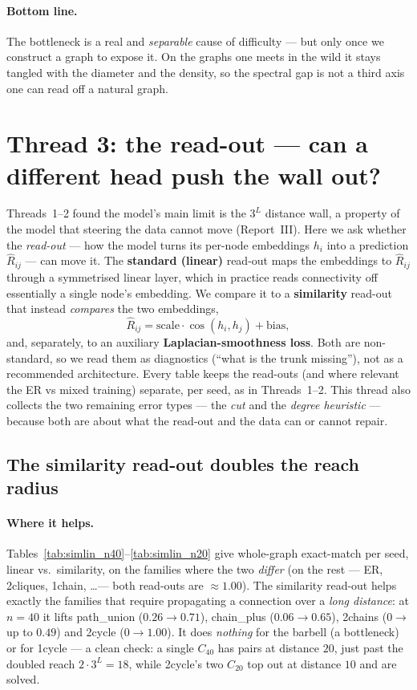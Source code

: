 \documentclass[11pt,a4paper]{article}
\begin{document}
\paragraph{Bottom line.} The bottleneck is a real and \emph{separable} cause of difficulty --- but
only once we construct a graph to expose it. On the graphs one meets in the wild it stays tangled
with the diameter and the density, so the spectral gap is not a third axis one can read off a
natural graph.

\section{Thread 3: the read-out --- can a different head push the wall out?}
\label{sec:readout}

Threads~1--2 found the model's main limit is the $3^L$ distance wall, a property of the model
that steering the data cannot move (Report~III). Here we ask whether the \emph{read-out} --- how
the model turns its per-node embeddings $h_i$ into a prediction $\hat R_{ij}$ --- can move it. The
\textbf{standard (linear)} read-out maps the embeddings to $\hat R_{ij}$ through a symmetrised
linear layer, which in practice reads connectivity off essentially a single node's embedding. We
compare it to a \textbf{similarity} read-out that instead \emph{compares} the two embeddings,
\[ \hat R_{ij} = \mathrm{scale}\cdot\cos(h_i, h_j) + \mathrm{bias}, \]
and, separately, to an auxiliary \textbf{Laplacian-smoothness loss}. Both are non-standard, so we
read them as diagnostics (``what is the trunk missing''), not as a recommended architecture. Every
table keeps the read-outs (and where relevant the ER vs mixed training) separate, per seed, as in
Threads~1--2. This thread also collects the two remaining error types --- the \emph{cut} and the
\emph{degree heuristic} --- because both are about what the read-out and the data can or cannot
repair.

\subsection{The similarity read-out doubles the reach radius}

\paragraph{Where it helps.} Tables~\ref{tab:simlin_n40}--\ref{tab:simlin_n20} give whole-graph
exact-match per seed, linear vs.\ similarity, on the families where the two \emph{differ} (on the
rest --- ER, 2cliques, 1chain, \ldots --- both read-outs are $\approx1.00$). The similarity
read-out helps exactly the families that require propagating a connection over a \emph{long
distance}: at $n=40$ it lifts path\_union ($0.26\to0.71$), chain\_plus ($0.06\to0.65$), 2chains
($0\to$ up to $0.49$) and 2cycle ($0\to1.00$). It does \emph{nothing} for the barbell (a
bottleneck) or for 1cycle --- a clean check: a single $C_{40}$ has pairs at distance $20$, just
past the doubled reach $2\cdot 3^L=18$, while 2cycle's two $C_{20}$ top out at distance $10$ and
are solved.
\end{document}
